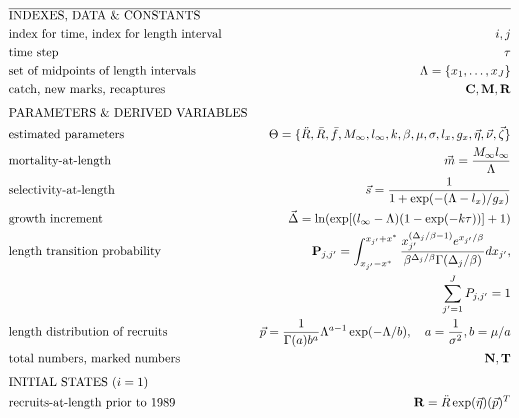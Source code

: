\begin{table}
  \centering
\caption{Data, parameters, and analytical procedures for the length-based mark-recapture model.}\label{table:LSMRmodel} 
\tableEq
	\begin{footnotesize}
    \begin{align}
        \hline
		&\mbox{INDEXES, DATA \& CONSTANTS} \nonumber\\
		&\mbox{index for time, index for length interval} 
		&i,j 
		\label{eq:T1.1}\\ 
		&\mbox{time step}  & \tau 
		\label{eq:T1.2}\\
		&\mbox{set of midpoints of length intervals}
		&\Lambda = \{x_1, \ldots,x_J\}
		\label{eq:T1.3}\\
		&\mbox{catch, new marks, recaptures} 
		&\mathbf{C}, \mathbf{M}, \mathbf{R}
		\label{eq:T1.4}\\[1ex]
		&\mbox{PARAMETERS \& DERIVED VARIABLES} \nonumber\\
		&\mbox{estimated parameters} 
		&\Theta=\{\ddot{R},\bar{R},\bar{f},M_\infty,l_\infty,k,\beta,\mu,\sigma,l_x,g_x,
		\vec{\eta},\vec{\nu},\vec{\zeta} \}
		\label{eq:T1.5}\\
		&\mbox{mortality-at-length} 
		& \vec{m} = \frac{M_\infty l_\infty}{\Lambda}
		\label{eq:T1.6}\\
		&\mbox{selectivity-at-length} 
		& \vec{s} = \frac{1}{1+\exp(-(\Lambda-l_x)/g_x)}
		\label{eq:T1.7}\\
		&\mbox{growth increment} 
		& \vec{\Delta} = \ln( \exp[(l_\infty-\Lambda)(1-\exp(-k \tau))] +1)
		\label{eq:T1.8}\\
		&\mbox{length transition probability}
		& \mathbf{P}_{j,j'} =\int_{x_{j'}-x^*}^{x_{j'}+x^*} \frac{x_{j'}^{(\Delta_{j}/\beta-1)}
		e^{x_{j'}/\beta}}{\beta^{\Delta_{j}/\beta} \Gamma(\Delta_{j}/\beta)}dx_{j'}, \nonumber\\
		& &\quad \sum_{j'=1}^J P_{j,j'}= 1 
		\label{eq:T1.9}\\
		&\mbox{length distribution of recruits}
		&\vec{p} = \frac{1}{\Gamma(a)b^a} \Lambda^{a-1}\exp(-\Lambda/b),\quad
		a=\frac{1}{\sigma^2}, b=\mu/a
		\label{eq:T1.10}\\
		&\mbox{total numbers, marked numbers} 
		& \mathbf{N}, \mathbf{T}
		\label{eq:T1.11}\\[1ex]
		&\mbox{INITIAL STATES ($i=1$)}  \nonumber\\
		&\mbox{recruits-at-length prior to 1989}
		&\mathbf{R} = \ddot{R}\exp(\vec{\eta}) (\vec{p})^T 
		\label{eq:T1.12}\\

\end{align}
\end{footnotesize}
\end{table}
